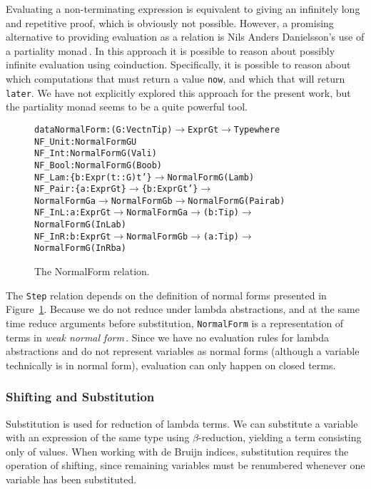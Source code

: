 Evaluating a non-terminating expression is equivalent to giving an infinitely long and repetitive proof, which is obviously not possible. However, a promising alternative to providing evaluation as a relation is Nils Anders Danielsson's use of a partiality monad\,\cite{Danielsson:2012:OSU:2364527.2364546}. In this approach it is possible to reason about possibly infinite evaluation using coinduction. Specifically, it is possible to reason about which computations that must return a value \texttt{now}, and which that will return \texttt{later}. We have not explicitly explored this approach for the present work, but the partiality monad seems to be a quite powerful tool.

\begin{figure}
\begin{alltt}
  data NormalForm : (G: Vect n Tip) \(\rightarrow\) Expr G t \(\rightarrow\) Type where
    NF_Unit : NormalForm G U
    NF_Int  : NormalForm G (Val i)
    NF_Bool : NormalForm G (Boo b)
    NF_Lam  : \{b: Expr (t :: G) t'\} \(\rightarrow\) NormalForm G (Lam b)
    NF_Pair : \{a: Expr G t\} \(\rightarrow\) \{b: Expr G t'\} \(\rightarrow\) 
              NormalForm G a \(\rightarrow\) NormalForm G b \(\rightarrow\) NormalForm G (Pair a b)
    NF_InL  : {a: Expr G t} \(\rightarrow\) NormalForm G a \(\rightarrow\) (b: Tip) \(\rightarrow\) 
              NormalForm G (InL a b)
    NF_InR  : {b: Expr G t} \(\rightarrow\) NormalForm G b \(\rightarrow\) (a: Tip) \(\rightarrow\) 
              NormalForm G (InR b a)
\end{alltt}
\caption{The NormalForm relation.}
\label{fig:normal-forms}
\end{figure}
The \texttt{Step} relation depends on the definition of normal forms presented in Figure~\ref{fig:normal-forms}. Because we do not reduce under lambda abstractions, and at the same time reduce arguments before substitution, \texttt{NormalForm} is a representation of terms in \emph{weak normal form}\,\cite{Sestoft:reduction}. Since we have no evaluation rules for lambda abstractions and do not represent variables as normal forms (although a variable technically is in normal form), evaluation can only happen on closed terms.

\subsubsection{Shifting and Substitution}
Substitution is used for reduction of lambda terms. We can substitute a variable with an expression of the same type using $\beta$-reduction, yielding a term consisting only of values. When working with de Bruijn indices, substitution requires the operation of shifting, since remaining variables must be renumbered whenever one variable has been substituted.

